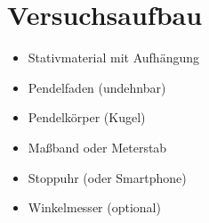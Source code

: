 \documentclass[11pt,a4paper]{scrartcl}
\begin{document}
	\section*{Versuchsaufbau}
	
	\begin{materialbox}
		\begin{minipage}{0.48\textwidth}
			\begin{itemize}
				\item Stativmaterial mit Aufhängung
				\item Pendelfaden (undehnbar)
				\item Pendelkörper (Kugel)
			\end{itemize}
		\end{minipage}
		\begin{minipage}{0.48\textwidth}
			\begin{itemize}
				\item Maßband oder Meterstab
				\item Stoppuhr (oder Smartphone)
				\item Winkelmesser (optional)
			\end{itemize}
		\end{minipage}
	\end{materialbox}
	
	\vspace{0.3cm}
	
\end{document}
